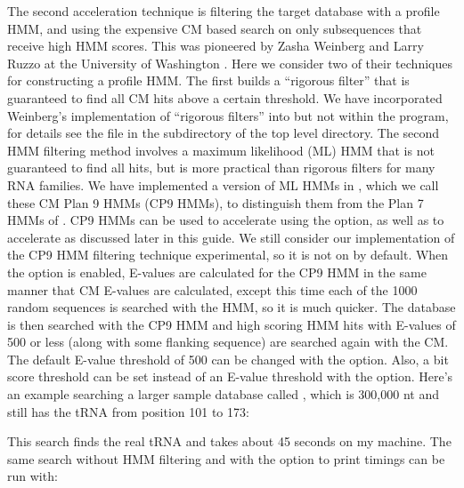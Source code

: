 The second acceleration technique is filtering the target database
with a profile HMM, and using the expensive CM based search on only
subsequences that receive high HMM scores. This was pioneered by Zasha
Weinberg and Larry Ruzzo at the University of Washington
\cite{WeinbergRuzzo04,WeinbergRuzzo04b,WeinbergRuzzo06}. Here we
consider two of their techniques for constructing a profile HMM. The
first builds a ``rigorous filter'' that is guaranteed to find all CM
hits above a certain threshold. We have incorporated Weinberg's
implementation of ``rigorous filters'' into  but
not within the  program, for details see the file
 in the 
subdirectory of the top level  directory. The second
HMM filtering method involves a maximum likelihood (ML) HMM that is
not guaranteed to find all hits, but is more practical than rigorous
filters for many RNA families. We have implemented a version of ML
HMMs in , which we call these CM Plan 9 HMMs (CP9
HMMs), to distinguish them from the Plan 7 HMMs of .
CP9 HMMs can be used to accelerate  using the
 option, as well as to accelerate  as
discussed later in this guide.  We still consider our implementation
of the CP9 HMM filtering technique experimental, so it is not on by
default.  When the  option is enabled, E-values are
calculated for the CP9 HMM in the same manner that CM E-values are
calculated, except this time each of the 1000 random sequences is
searched with the HMM, so it is much quicker. The database is then
searched with the CP9 HMM and high scoring HMM hits with E-values of
500 or less (along with some flanking sequence) are searched again with
the CM.  The default E-value threshold of 500 can be changed with the
 option. Also, a bit score threshold can be set instead
of an E-value threshold with the  option.  Here's an
example searching a larger sample database called
, which is 300,000 nt and still has the tRNA
from position 101 to 173:


This search finds the real tRNA and takes about 45 seconds on my
machine. The same search without HMM filtering and with the 
option to print timings can be run with:


